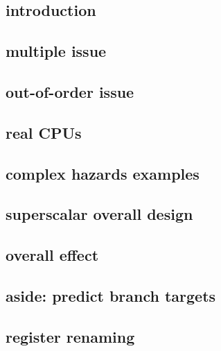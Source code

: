 
\subsection{introduction}

\subsection{multiple issue}


\subsection{out-of-order issue}


\subsection{real CPUs}


\subsection{complex hazards examples}

\subsection{superscalar overall design}



\subsection{overall effect}


\subsection{aside: predict branch targets}

%

\subsection{register renaming}

